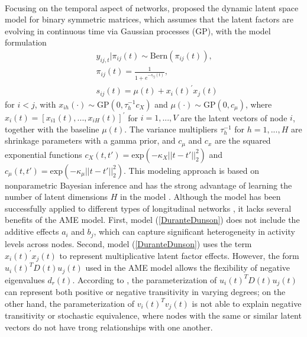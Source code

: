 \documentclass[a4paper]{article}
\begin{document}
		\\ \newline Focusing on the temporal aspect of networks, \cite{durante2013nonparametric} proposed the dynamic latent space model for binary symmetric matrices, which 
		assumes that the latent factors are evolving in continuous time via Gaussian processes (GP), with the model formulation
		\begin{equation}\label{DuranteDunson}
			\begin{aligned}
				&y_{ij, t}|\pi_{ij}(t) \sim \mbox{Bern}(\pi_{ij}(t)),\\
				& \pi_{ij}(t) = \frac{1}{1+e^{-s_{ij}(t)}},\\
				& s_{ij}(t) = \mu(t) + x_i(t)^\prime x_j(t)
			\end{aligned}
		\end{equation}
		for $i<j$, with $x_{ih}(\cdot) \sim \mbox{GP}(0, \tau_h^{-1}c_X)$ and $\mu(\cdot) \sim \mbox{GP}(0, c_\mu)$,
		where $x_i(t)=[x_{i1}(t),...,x_{iH}(t)]^\prime$ for $i = 1,...,V$ are the latent vectors of node $i$, together with the baseline $\mu(t)$. The variance multipliers $\tau_h^{-1}$ for $h=1,...,H$ are shrinkage parameters with a gamma prior, and $c_\mu$ and $c_x$ are the squared exponential functions $c_X(t, t') = \mbox{exp}(-\kappa_X||t-t'||_2^2)$ and $c_\mu(t, t') = \mbox{exp}(-\kappa_\mu||t-t'||_2^2)$. This modeling approach is based on nonparametric Bayesian inference and has the strong advantage of learning the number of latent dimensions $H$ in the model \citep{bhattacharya2011sparse}. Although the model has been successfully applied to different types of longitudinal networks \citep{durante2014bayesian2,durante2014bayesian}, it lacks several benefits of the AME model. First, model (\ref{DuranteDunson}) does not include the additive effects $a_i$ and $b_j$, which can capture significant heterogeneity in activity levels across nodes. Second, model (\ref{DuranteDunson}) uses the term $x_i(t)^\prime x_j(t)$ to represent multiplicative latent factor effects. However, the form $u_i(t)^TD(t)u_j(t)$ used in the AME model allows the flexibility of negative eigenvalues $d_r(t)$. According to \cite{hoff2008modeling}, the parameterization of $u_i(t)^TD(t)u_j(t)$ can represent both positive or negative transitivity in varying degrees; on the other hand, the parameterization of $v_i(t)^Tv_j(t)$ is not able to explain negative transitivity or stochastic equivalence, where nodes with the same or similar latent vectors do not have trong relationships with one another.\\ \newline
\end{document}

